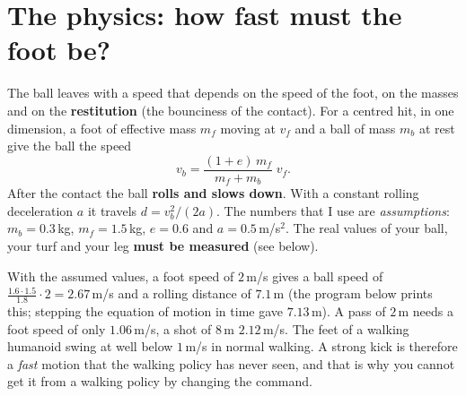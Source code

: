 \section*{The physics: how fast must the foot be?}
The ball leaves with a speed that depends on the speed of the foot, on the masses and on the \textbf{restitution} (the bounciness of the contact). For a centred hit, in one dimension, a foot of effective mass $m_f$ moving at $v_f$ and a ball of mass $m_b$ at rest give the ball the speed
\[
v_b=\frac{(1+e)\,m_f}{m_f+m_b}\;v_f .
\]
After the contact the ball \textbf{rolls and slows down}. With a constant rolling deceleration $a$ it travels $d=v_b^2/(2a)$. The numbers that I use are \emph{assumptions}: $m_b=0.3$\,kg, $m_f=1.5$\,kg, $e=0.6$ and $a=0.5$\,m/s$^2$. The real values of your ball, your turf and your leg \textbf{must be measured} (see below).

\begin{center}
\end{center}

\begin{example}
With the assumed values, a foot speed of $2$\,m/s gives a ball speed of $\tfrac{1.6\cdot1.5}{1.8}\cdot2=2.67$\,m/s and a rolling distance of $7.1$\,m (the program below prints this; stepping the equation of motion in time gave $7.13$\,m). A pass of $2$\,m needs a foot speed of only $1.06$\,m/s, a shot of $8$\,m $2.12$\,m/s. The feet of a walking humanoid swing at well below $1$\,m/s in normal walking. A strong kick is therefore a \emph{fast} motion that the walking policy has never seen, and that is why you cannot get it from a walking policy by changing the command.
\end{example}

